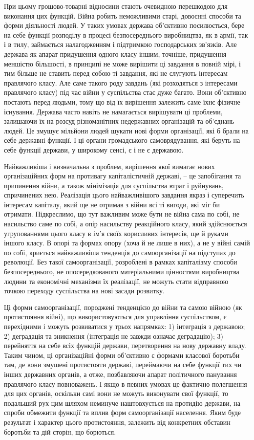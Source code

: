 \documentclass[12pt,a4paper,openany]{book}
\begin{document}
При цьому грошово-товарні відносини стають очевидною перешкодою для виконання цих функцій. Війна робить неможливими старі, довоєнні способи та форми діяльності людей. У таких умовах держава об’єктивно посилюється, бере на себе функції розподілу в процесі безпосереднього виробництва, як в армії, так і в тилу, займається налагодженням і підтримкою господарських зв’язків. Але держава як апарат придушення одного класу іншим, точніше, придушення меншістю більшості, в принципі не може вирішити ці завдання в повній мірі, і тим більше не ставить перед собою ті завдання, які не слугують інтересам правлячого класу. Але саме такого роду завдань (які розходяться з інтересами правлячого класу) під час війни у суспільства стає дуже багато. Вони об’єктивно постають перед людьми, тому що від їх вирішення залежить саме їхнє фізичне існування. Держава часто навіть не намагається вирішувати ці проблеми, залишаючи їх на розсуд різноманітних недержавних організацій та об’єднань людей. Це змушує мільйони людей шукати нові форми організації, які б брали на себе державні функції. І ці органи громадського самоврядування, які беруть на себе функції держави, у широкому сенсі, є і не є державою.

Найважливіша і визначальна з проблем, вирішення якої вимагає нових організаційних форм на противагу капіталістичній державі, – це запобігання та припинення війни, а також мінімізація для суспільства втрат і руйнувань, спричинених нею. Реалізація цього найважливішого завдання якраз і суперечить інтересам капіталу, який ще не отримав з війни всі ті вигоди, які міг би отримати. Підкреслимо, що тут важливим може бути не війна сама по собі, не насильство саме по собі, а опір насильству реакційного класу, який здійснюється угрупованнями цього класу в ім’я своїх корисливих інтересів, ще й руками іншого класу. В опорі та формах опору (хоча й не лише в них), а не у війні самій по собі, криється найважливіша тенденція до самоорганізації на підступах до революції. Без такої самоорганізації, розроблені в рамках капіталізму способи безпосереднього, не опосередкованого матеріальними цінностями виробництва людини та економічні механізми їх реалізації, не можуть стати відправною точкою переходу суспільства на нові засади розвитку.

Ці форми самоорганізації, породжені тенденцією до війни та самою війною (як протистояння війні), що використовуються для управління суспільством, є перехідними і можуть розвиватися у трьох напрямках: 1) інтеграція з державою; 2) деградація та зникнення (інтеграція не завжди означає деградацію); 3) перейняття на себе всіх функцій держави, перетворення на нову державну владу. Таким чином, ці організаційні форми об’єктивно є формами класової боротьби там, де вони змушені протистояти державі, переймаючи на себе функції тих чи інших державних органів, а отже, позбавляючи апарат політичного панування правлячого класу повноважень. І якщо в певних умовах це фактично полегшення для цих органів, оскільки самі вони не можуть виконувати свої функції, то подальший рух цим шляхом неминуче наштовхується на протидію держави, на спроби обмежити функції та вплив форм самоорганізації населення. Яким буде результат і характер цього протистояння, залежить від конкретних обставин боротьби та дій сторін, що борються.
\end{document}
